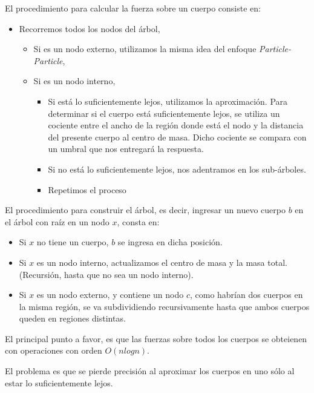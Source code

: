 El procedimiento para calcular la fuerza sobre un cuerpo consiste en:
\begin{itemize}
	\item Recorremos todos los nodos del árbol,
	\begin{itemize}
		\item Si es un nodo externo,
			utilizamos la misma idea del enfoque \emph{Particle-Particle},
		\item Si es un nodo interno,
		\begin{itemize}
			\item Si está lo suficientemente lejos, utilizamos la aproximación.
				Para determinar si el cuerpo está suficientemente lejos,
				se utiliza un cociente entre el ancho de la región donde está
				el nodo y la distancia del presente cuerpo al centro de masa.
				Dicho cociente se compara con un umbral que nos entregará la respuesta.
			\item Si no está lo suficientemente lejos, nos adentramos en los sub-árboles.
		\item Repetimos el proceso
		\end{itemize}
	\end{itemize}
\end{itemize}

El procedimiento para construir el árbol,
es decir, ingresar un nuevo cuerpo $b$ en el árbol
con raíz en un nodo $x$, consta en:
\begin{itemize}
	\item Si $x$ no tiene un cuerpo, $b$ se ingresa en dicha posición.
	\item Si $x$ es un nodo interno, actualizamos el centro de masa y la masa total.
		(Recursión, hasta que no sea un nodo interno).
	\item Si $x$ es un nodo externo, y contiene un nodo $c$,
		como habrían dos cuerpos en la misma región,
		se va subdividiendo recursivamente hasta que ambos cuerpos
		queden en regiones distintas.
\end{itemize}

El principal punto a favor,
es que las fuerzas sobre todos los cuerpos se obteienen con operaciones
con orden $O(n log n)$.

El problema es que se pierde precisión al aproximar los cuerpos
en uno sólo al estar lo suficientemente lejos.



